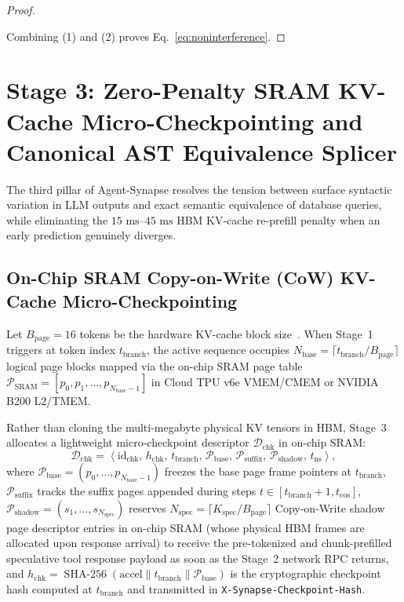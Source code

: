 \documentclass[10pt,conference]{IEEEtran}
\begin{document}
\begin{proof}
\begin{enumerate}
\end{enumerate}
Combining (1) and (2) proves Eq.~\eqref{eq:noninterference}.
\end{proof}

\section{Stage 3: Zero-Penalty SRAM KV-Cache Micro-Checkpointing and Canonical AST Equivalence Splicer}
\label{sec:stage3}

The third pillar of Agent-Synapse resolves the tension between surface syntactic variation in LLM outputs and exact semantic equivalence of database queries, while eliminating the $15\text{ ms}$--$45\text{ ms}$ HBM KV-cache re-prefill penalty when an early prediction genuinely diverges.

\subsection{On-Chip SRAM Copy-on-Write (CoW) KV-Cache Micro-Checkpointing}
Let $B_{\text{page}} = 16$ tokens be the hardware KV-cache block size~\cite{kwon2023efficient}. When Stage~1 triggers at token index $t_{\text{branch}}$, the active sequence occupies $N_{\text{base}} = \lceil t_{\text{branch}} / B_{\text{page}} \rceil$ logical page blocks mapped via the on-chip SRAM page table $\mathcal{P}_{\text{SRAM}} = [p_0, p_1, \dots, p_{N_{\text{base}}-1}]$ in Cloud TPU v6e VMEM/CMEM or NVIDIA B200 L2/TMEM.

Rather than cloning the multi-megabyte physical KV tensors in HBM, Stage~3 allocates a lightweight micro-checkpoint descriptor $\mathcal{D}_{\text{chk}}$ in on-chip SRAM:
\begin{equation}
\mathcal{D}_{\text{chk}} = \left\langle \text{id}_{\text{chk}},\, h_{\text{chk}},\, t_{\text{branch}},\, \mathcal{P}_{\text{base}},\, \mathcal{P}_{\text{suffix}},\, \mathcal{P}_{\text{shadow}},\, t_{\text{ns}} \right\rangle,
\label{eq:checkpoint_desc}
\end{equation}
where $\mathcal{P}_{\text{base}} = (p_0, \dots, p_{N_{\text{base}}-1})$ freezes the base page frame pointers at $t_{\text{branch}}$, $\mathcal{P}_{\text{suffix}}$ tracks the suffix pages appended during steps $t \in [t_{\text{branch}}+1, t_{\text{eos}}]$, $\mathcal{P}_{\text{shadow}} = (s_1, \dots, s_{N_{\text{spec}}})$ reserves $N_{\text{spec}} = \lceil K_{\text{spec}} / B_{\text{page}} \rceil$ Copy-on-Write shadow page descriptor entries in on-chip SRAM (whose physical HBM frames are allocated upon response arrival) to receive the pre-tokenized and chunk-prefilled speculative tool response payload as soon as the Stage~2 network RPC returns, and $h_{\text{chk}} = \operatorname{SHA-256}(\text{accel} \parallel t_{\text{branch}} \parallel \mathcal{P}_{\text{base}})$ is the cryptographic checkpoint hash computed at $t_{\text{branch}}$ and transmitted in \texttt{X-Synapse-Checkpoint-Hash}.
\end{document}
